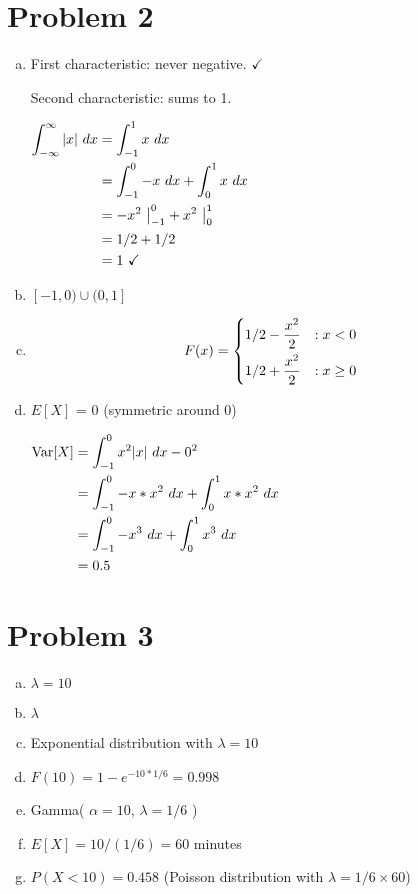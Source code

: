 \documentclass[11pt]{article}
\newenvironment{equ}{$\hfill\begin{aligned}[t]}{\end{aligned}\hfill \null$}
\begin{document}
\section*{Problem 2}
\begin{enumerate}[(a)]
	\item First characteristic: never negative. $\checkmark$
	
	Second characteristic: sums to 1.
	
	\begin{equ}
	\int _{-\infty} ^{\infty} |x|\ dx &= \int _{-1} ^1 x\ dx \\
	&= \int _{-1} ^0 -x \ dx + \int _0 ^1 x\ dx \\
	&= -x^2\ \big| _{-1} ^0 + x^2\ \big| _{0}	^1 \\
	&= 1/2 + 1/2\\
	&= 1\ \checkmark
	\end{equ}
	
	\item $[-1,0) \cup (0, 1]$
	
	\item 
		\[F(x) =
		\begin{cases}
			1/2-\dfrac{x^2}{2} & : x < 0 \vspace{1ex} \\ 
			1/2 + \dfrac{x^2}{2} & : x \geq 0
		\end{cases}
		\]
		
	\item 
		$E[X]$ = 0 (symmetric around 0)
		
		\begin{equ}
			\text{Var}[X] &= \int _{-1} ^0 x^2 |x|\ dx - 0^2 \\
			&= \int _{-1} ^0 -x * x^2 \ dx + \int _0 ^1 x * x^2\ dx \\
			&= \int _{-1} ^0 -x^3 \ dx + \int _0 ^1 x^3 \ dx \\
			&= 0.5
		\end{equ}

\end{enumerate}



\section*{Problem 3}
\begin{enumerate}[(a)]
	\item $\lambda = 10$
	\item $\lambda$
	\item Exponential distribution with $\lambda = 10$
	\item $F(10) = 1 - e^{-10 * 1/6} = 0.998$
	\item Gamma( $\alpha = 10$, $\lambda = 1/6$ )
	\item $E[X] = 10/(1/6) = 60$ minutes
	\item $P( X < 10 ) = 0.458$ (Poisson distribution with $\lambda = 1/6 \times 60$)
\end{enumerate}
	
\end{document}
